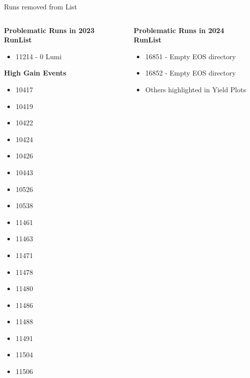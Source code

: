 \begin{subframe}{Runs removed from List}
    \begin{columns}
        \begin{column}{0.5 \linewidth}
            \scriptsize \textbf{Problematic Runs in 2023 RunList}
            \begin{itemize}
                \setlength\itemsep{-0.1em}
                \scriptsize
                \item 11214 - 0 Lumi
            \end{itemize}
            \textbf{High Gain Events}
            \begin{itemize}
                \setlength\itemsep{-0.05em}
                \scriptsize
                \item 10417 
                \item 10419 
                \item 10422 
                \item 10424 
                \item 10426 
                \item 10443 
                \item 10526 
                \item 10538 
                \item 11461 
                \item 11463 
                \item 11471 
                \item 11478 
                \item 11480 
                \item 11486 
                \item 11488 
                \item 11491 
                \item 11504 
                \item 11506 
            \end{itemize}
        \end{column}
        \begin{column}{0.5\linewidth}
            \scriptsize \textbf{Problematic Runs in 2024 RunList}
            \begin{itemize}
                \scriptsize
                \item 16851 - Empty EOS directory
                \item 16852 - Empty EOS directory
                \item Others highlighted in Yield Plots
            \end{itemize}
        \end{column}
    \end{columns}
\end{subframe}


